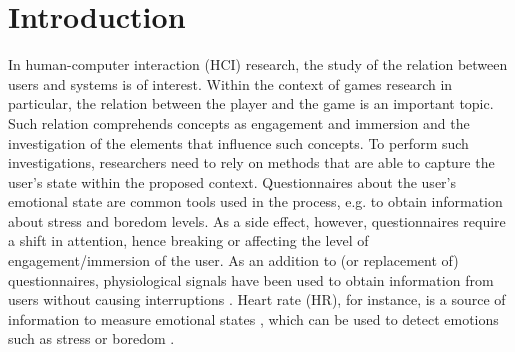 \chapter{Introduction}
\label{c:introduction}

In human-computer interaction (HCI) research, the study of the relation between users and systems is of interest. Within the context of games research in particular, the relation between the player and the game is an important topic. Such relation comprehends concepts as engagement and immersion \parencite{boyle2012engagement} and the investigation of the elements that influence such concepts.
To perform such investigations, researchers need to rely on methods that are able to capture the user's state within the proposed context. Questionnaires about the user's emotional state are common tools used in the process, e.g. to obtain information about stress and boredom levels.
As a side effect, however, questionnaires require a shift in attention, hence breaking or affecting the level of engagement/immersion of the user. As an addition to (or replacement of) questionnaires, physiological signals have been used to obtain information from users without causing interruptions \parencite{bousefsaf2013remote,yun2009game,rani2006empirical,tijs2008dynamic}. Heart rate (HR), for instance, is a source of information to measure emotional states \parencite{kivikangas2011review}, which can be used to detect emotions such as stress \parencite{choi2009using} or boredom \parencite{yamakoshi2007preliminary}.

